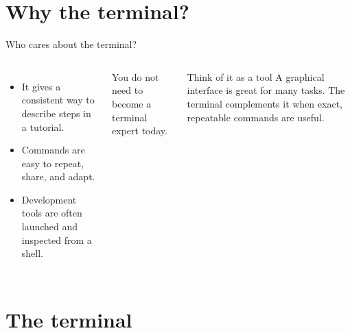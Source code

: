 \documentclass[aspectratio=169,10pt]{beamer}
\begin{document}
\section{Why the terminal?}

\begin{frame}{Who cares about the terminal?}
  \begin{columns}[T,onlytextwidth]
      \begin{itemize}
        \item It gives a consistent way to describe steps in a tutorial.
        \item Commands are easy to repeat, share, and adapt.
        \item Development tools are often launched and inspected from a shell.
      \end{itemize}
      \vspace{0.25cm}
      \alert{You do not need to become a terminal expert today.}
      \begin{block}{Think of it as a tool}
        A graphical interface is great for many tasks. The terminal complements it when exact, repeatable commands are useful.
      \end{block}
  \end{columns}
\end{frame}

\section{The terminal}
\end{document}
